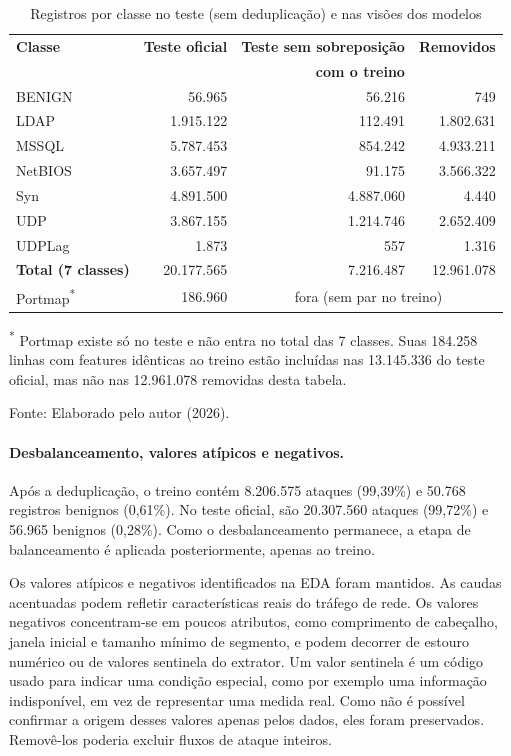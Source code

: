 \documentclass[
    12pt,                %
    openright,           %
    oneside,             %
    a4paper,             %
    english,             %
    brazil               %
]{abntex2}
\begin{document}
\begin{table}
\centering
\caption{Registros por classe no teste (sem deduplicação) e nas visões dos modelos}
\label{tab:teste-classes}
\begin{tabular}{lrrr}
\hline
\textbf{Classe} & \textbf{Teste oficial} & \textbf{Teste sem sobreposição} & \textbf{Removidos} \\
 & & \textbf{com o treino} & \\
\hline
BENIGN  & 56.965    & 56.216    & 749        \\
LDAP    & 1.915.122 & 112.491   & 1.802.631  \\
MSSQL   & 5.787.453 & 854.242   & 4.933.211  \\
NetBIOS & 3.657.497 & 91.175    & 3.566.322  \\
Syn     & 4.891.500 & 4.887.060 & 4.440      \\
UDP     & 3.867.155 & 1.214.746 & 2.652.409  \\
UDPLag  & 1.873     & 557       & 1.316      \\
\hline
\textbf{Total (7 classes)} & 20.177.565 & 7.216.487 & 12.961.078 \\
\hline
Portmap\textsuperscript{*} & 186.960 & \multicolumn{2}{c}{fora (sem par no treino)} \\
\hline
\end{tabular}
\par\vspace{2pt}
{\footnotesize \textsuperscript{*} Portmap existe só no teste e não entra no total das 7 classes. Suas 184.258 linhas com features idênticas ao treino estão incluídas nas 13.145.336 do teste oficial, mas não nas 12.961.078 removidas desta tabela.}
\par\vspace{2pt}
{\footnotesize Fonte: Elaborado pelo autor (2026).}
\end{table}

\paragraph{Desbalanceamento, valores atípicos e negativos.}
Após a deduplicação, o treino contém 8.206.575 ataques (99,39\%) e 50.768 registros benignos (0,61\%). No teste oficial, são 20.307.560 ataques (99,72\%) e 56.965 benignos (0,28\%). Como o desbalanceamento permanece, a etapa de balanceamento é aplicada posteriormente, apenas ao treino.

Os valores atípicos e negativos identificados na EDA foram mantidos. As caudas acentuadas podem refletir características reais do tráfego de rede. Os valores negativos concentram-se em poucos atributos, como comprimento de cabeçalho, janela inicial e tamanho mínimo de segmento, e podem decorrer de estouro numérico ou de valores sentinela do extrator. Um valor sentinela é um código usado para indicar uma condição especial, como por exemplo uma informação indisponível, em vez de representar uma medida real. Como não é possível confirmar a origem desses valores apenas pelos dados, eles foram preservados. Removê-los poderia excluir fluxos de ataque inteiros.
\end{document}
